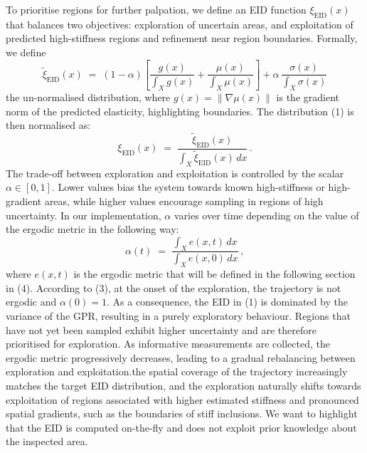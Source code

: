 \documentclass[11pt]{article}
\begin{document}
\noindent
To prioritise regions for further palpation, we define an EID function
$\xi_{\mathrm{EID}}(x)$ that balances two objectives: exploration of
uncertain areas, and exploitation of predicted high-stiffness regions
and refinement near region boundaries. Formally, we define
\begin{equation}
\tilde{\xi}_{\mathrm{EID}}(x)
  \;=\; (1-\alpha)\!\left[\frac{g(x)}{\int_{X} g(x)}
                         + \frac{\mu(x)}{\int_{X} \mu(x)}\right]
     + \alpha\,\frac{\sigma(x)}{\int_{X} \sigma(x)}
\end{equation}
the un-normalised distribution, where $g(x) = \|\nabla \mu(x)\|$ is
the gradient norm of the predicted elasticity, highlighting
boundaries. The distribution (1) is then normalised as:
\begin{equation}
\xi_{\mathrm{EID}}(x)
  \;=\; \frac{\tilde{\xi}_{\mathrm{EID}}(x)}%
             {\int_{X} \tilde{\xi}_{\mathrm{EID}}(x)\,dx}\,.
\end{equation}
The trade-off between exploration and exploitation is controlled by
the scalar $\alpha \in [0,1]$. Lower values bias the system towards
known high-stiffness or high-gradient areas, while higher values
encourage sampling in regions of high uncertainty. In our
implementation, $\alpha$ varies over time depending on the value of
the ergodic metric in the following way:
\begin{equation}
\alpha(t) \;=\; \frac{\int_{X} e(x,t)\,dx}{\int_{X} e(x,0)\,dx}\,,
\end{equation}
where $e(x,t)$ is the ergodic metric that will be defined in the
following section in (4). According to (3), at the onset of the
exploration, the trajectory is not ergodic and $\alpha(0) = 1$. As a
consequence, the EID in (1) is dominated by the variance of the GPR,
resulting in a purely exploratory behaviour. Regions that have not
yet been sampled exhibit higher uncertainty and are therefore
prioritised for exploration. As informative measurements are
collected, the ergodic metric progressively decreases, leading to a
gradual rebalancing between exploration and exploitation.the spatial
coverage of the trajectory increasingly matches the target EID
distribution, and the exploration naturally shifts towards
exploitation of regions associated with higher estimated stiffness
and pronounced spatial gradients, such as the boundaries of stiff
inclusions. We want to highlight that the EID is computed on-the-fly
and does not exploit prior knowledge about the inspected area.

\vspace{0.6em}
\end{document}

